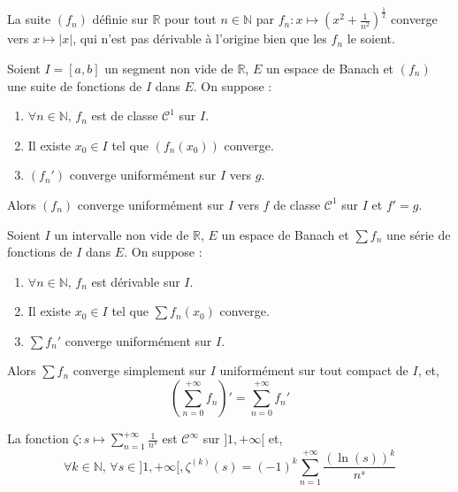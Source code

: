   \begin{cexample}
    La suite $(f_n)$ définie sur $\mathbb{R}$ pour tout $n \in \mathbb{N}$ par $f_n : x \mapsto \left( x^2 + \frac{1}{n^2} \right)^{\frac{1}{2}}$ converge vers $x \mapsto \vert x \vert$, qui n'est pas dérivable à l'origine bien que les $f_n$ le soient.
  \end{cexample}


  \begin{theorem}
    Soient $I = [a,b]$ un segment non vide de $\mathbb{R}$, $E$ un espace de Banach et $(f_n)$ une suite de fonctions de $I$ dans $E$. On suppose :
    \begin{enumerate}[label=(\roman*)]
      \item $\forall n \in \mathbb{N}, \, f_n$ est de classe $\mathcal{C}^1$ sur $I$.
      \item Il existe $x_0 \in I$ tel que $(f_n(x_0))$ converge.
      \item $(f_n')$ converge uniformément sur $I$ vers $g$.
    \end{enumerate}
    Alors $(f_n)$ converge uniformément sur $I$ vers $f$ de classe $\mathcal{C}^1$ sur $I$ et $f' = g$.
  \end{theorem}

  \begin{theorem}
    Soient $I$ un intervalle non vide de $\mathbb{R}$, $E$ un espace de Banach et $\sum f_n$ une série de fonctions de $I$ dans $E$. On suppose :
    \begin{enumerate}[label=(\roman*)]
      \item $\forall n \in \mathbb{N}, \, f_n$ est dérivable sur $I$.
      \item Il existe $x_0 \in I$ tel que $\sum f_n(x_0)$ converge.
      \item $\sum f_n'$ converge uniformément sur $I$.
    \end{enumerate}
    Alors $\sum f_n$ converge simplement sur $I$ uniformément sur tout compact de $I$, et,
    \[ \left( \sum_{n=0}^{+\infty} f_n \right)' = \sum_{n=0}^{+\infty} f_n' \]
  \end{theorem}

  \begin{example}
    La fonction $\zeta : s \mapsto \sum_{n=1}^{+\infty} \frac{1}{n^s}$ est $\mathcal{C}^\infty$ sur $]1, +\infty[$ et,
    \[ \forall k \in \mathbb{N}, \, \forall s \in ]1, +\infty[, \zeta^{(k)}(s) = (-1)^k \sum_{n=1}^{+\infty} \frac{(\ln(s))^k}{n^s} \]
  \end{example}

